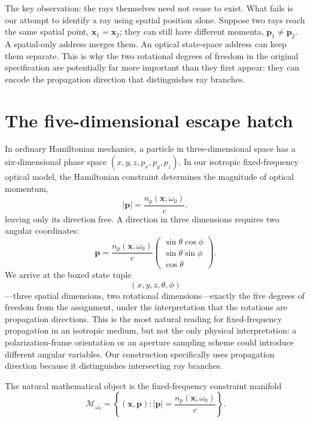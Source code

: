 \documentclass[11pt]{article}
\newcommand{\xv}{\mathbf{x}}
\newcommand{\pv}{\mathbf{p}}
\newcommand{\Mopt}{\mathcal{M}_{\omega_0}}
\begin{document}
The key observation: the rays themselves need not cease to exist. What fails is our
attempt to identify a ray using spatial position alone. Suppose two rays reach the same
spatial point, $\xv_1 = \xv_2$; they can still have different momenta,
$\pv_1 \ne \pv_2$. A spatial-only address merges them. An optical state-space address
can keep them separate. This is why the two rotational degrees of freedom in the
original specification are potentially far more important than they first appear: they
can encode the propagation direction that distinguishes ray branches.

\section{The five-dimensional escape hatch}\label{sec:phase-space}

In ordinary Hamiltonian mechanics, a particle in three-dimensional space has a
six-dimensional phase space $(x,y,z,p_x,p_y,p_z)$. In our isotropic fixed-frequency
optical model, the Hamiltonian constraint determines the magnitude of optical momentum,
\begin{equation}
|\pv| = \frac{n_p(\xv,\omega_0)}{c},
\end{equation}
leaving only its direction free. A direction in three dimensions requires two angular
coordinates:
\begin{equation}
\pv = \frac{n_p(\xv,\omega_0)}{c}
\begin{pmatrix} \sin\theta\cos\phi \\ \sin\theta\sin\phi \\ \cos\theta \end{pmatrix}.
\end{equation}
We arrive at the boxed state tuple
\begin{equation}
\boxed{(x,y,z,\theta,\phi)}
\end{equation}
---three spatial dimensions, two rotational dimensions---exactly the five degrees of
freedom from the assignment, under the interpretation that the rotations are
propagation directions. This is the most natural reading for fixed-frequency
propagation in an isotropic medium, but not the only physical interpretation: a
polarization-frame orientation or an aperture sampling scheme could introduce different
angular variables. Our construction specifically uses propagation direction because it
distinguishes intersecting ray branches.

The natural mathematical object is the fixed-frequency constraint manifold
\begin{equation}
\Mopt = \left\{ (\xv,\pv) : |\pv| = \frac{n_p(\xv,\omega_0)}{c} \right\}.
\end{equation}
\end{document}
